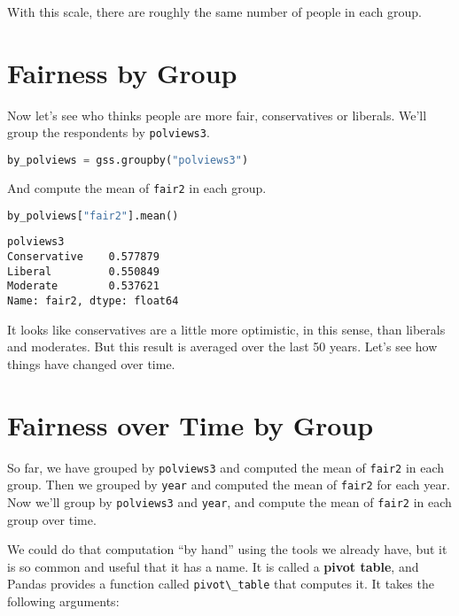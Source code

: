 With this scale, there are roughly the same number of people in each
group.

\section{Fairness by Group}\label{fairness-by-group}

Now let's see who thinks people are more fair, conservatives or
liberals. We'll group the respondents by
\passthrough{\lstinline!polviews3!}.

\begin{lstlisting}[language=Python,style=source]
by_polviews = gss.groupby("polviews3")
\end{lstlisting}

And compute the mean of \passthrough{\lstinline!fair2!} in each group.

\begin{lstlisting}[language=Python,style=source]
by_polviews["fair2"].mean()
\end{lstlisting}

\begin{lstlisting}[style=output]
polviews3
Conservative    0.577879
Liberal         0.550849
Moderate        0.537621
Name: fair2, dtype: float64
\end{lstlisting}

It looks like conservatives are a little more optimistic, in this sense,
than liberals and moderates. But this result is averaged over the last
50 years. Let's see how things have changed over time.

\section{Fairness over Time by Group}\label{fairness-over-time-by-group}

So far, we have grouped by \passthrough{\lstinline!polviews3!} and
computed the mean of \passthrough{\lstinline!fair2!} in each group. Then
we grouped by \passthrough{\lstinline!year!} and computed the mean of
\passthrough{\lstinline!fair2!} for each year. Now we'll group by
\passthrough{\lstinline!polviews3!} and \passthrough{\lstinline!year!},
and compute the mean of \passthrough{\lstinline!fair2!} in each group
over time.

We could do that computation ``by hand'' using the tools we already
have, but it is so common and useful that it has a name. It is called a
\textbf{pivot table}, and Pandas provides a function called
\passthrough{\lstinline!pivot\_table!} that computes it. It takes the
following arguments:

